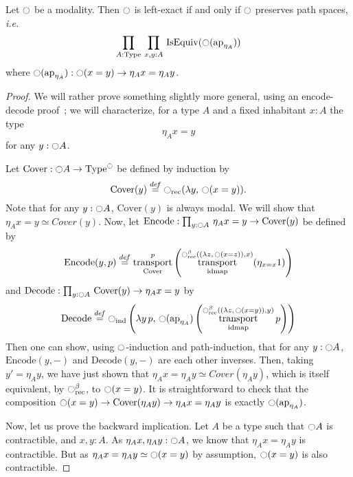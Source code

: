 \documentclass[notfinal]{jfrarticle}
\DeclareMathOperator{\Type}{Type}
\DeclareMathOperator{\IsEquiv}{IsEquiv}
\DeclareMathOperator{\idmap}{\mathrm{idmap}}
\DeclareMathOperator{\transport}{transport}
\newcommand \defeq {\overset{de\hspace{-0.2ex}f}{=}}
\newcommand{\modal}{\ensuremath{\ocircle}}
\newcommand{\prodD}[3]{\prod_{#1:#2}\, #3}
\newcommand{\ap}[1]{\mathrm{ap}_{#1}}
\newcommand{\ie}{\emph{i.e.}}
\begin{document}
\begin{prop}\label{prop:lex}
  Let $\modal$ be a modality. Then $\modal$ is left-exact if and only
  if
  $\modal$ preserves path spaces, \ie{}
    \[
      \prodD A \Type {\prodD {x,y} A {\IsEquiv (\modal (\ap{\eta_A}))}}
    \]
    where $\modal (\ap{\eta_A}) : \modal(x = y) \to \eta_A x = \eta_A
    y$.
\end{prop}
\begin{proof}
  We will rather prove something slightly more general, using an
  encode-decode proof~\cite[Section 8.9]{hottbook}; we will
  characterize, for a type $A$ and a fixed inhabitant $x:A$ the type 
  \[ \eta_A x = y \] 
  for any $y:\modal A$.
  
  \newcommand{\Cover}{\mathrm{Cover}}
  \newcommand{\Encode}{\mathrm{Encode}}
  \newcommand{\Decode}{\mathrm{Decode}}
  Let $\Cover:\modal A \to \Type^\modal$ be defined by induction by
  \[ \Cover(y) \defeq \modal_{\mathrm{rec}} (\lambda y,\,\modal (x =
    y)). \]
  Note that for any $y:\modal A$, $\Cover(y)$ is always modal.
  We will show that $\eta_A x = y \simeq Cover(y)$.
  Now, let $\Encode : \prodD y {\modal A} {\eta_A x = y \to
    \Cover(y)}$ be defined by
  \[ \Encode(y,p) \defeq \transport_{\Cover}^p
    \left(\transport_{\idmap}^{\modal_{\mathrm{rec}}^\beta ((\lambda
        z,\,\modal (x = z)), x)} (\eta_{x=x} 1)\right) \]
  and $\Decode:\prodD y {\modal A} {\Cover(y) \to \eta_A x = y}$ by
  \[
    \Decode \defeq \modal_{\mathrm{ind}} \left(\lambda y\,p,\,
    \modal(\ap{\eta_A})  \left(\transport_{\idmap}^{\modal_{\mathrm{rec}}^\beta ((\lambda
        z,\,\modal (x = y)),y)} p\right)\right)
  \]
  Then one can show, using $\modal$-induction and path-induction, that
  for any $y:\modal A$, $\Encode(y,-)$ and $\Decode(y,-)$
  are each other inverses. Then, taking $y' = \eta_A y$, we have just
  shown that $\eta_A x = \eta_A y \simeq Cover(\eta_A y)$, which is
  itself equivalent, by $\modal_{\mathrm{rec}}^\beta$, to $\modal
  (x=y)$.
  It is straightforward to check that the composition $\modal (x=y)
  \to \Cover(\eta_A y) \to \eta_A x = \eta_A y$ is exactly $\modal
  (\ap{\eta_A})$.
  
  Now, let us prove the backward implication. Let $A$ be a type such
  that $\modal A$ is contractible, and $x,y:A$. 
  As $\eta_A x,\eta_A y: \modal A$, we know that $\eta_A x = \eta_A y$
  is contractible. But as $\eta_A x = \eta_A y \simeq \modal (x=y)$ by
  assumption, $\modal (x=y)$ is also contractible.
\end{proof}
\end{document}
